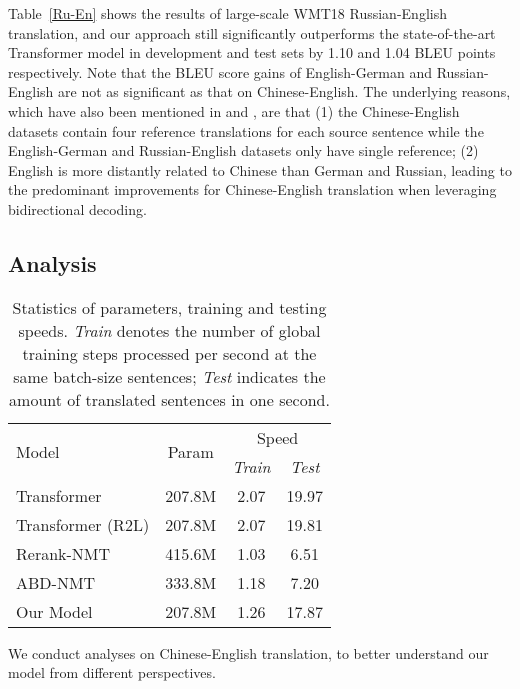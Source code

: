 \documentclass[11pt,a4paper]{article}
\begin{document}
\begin{CJK*}{UTF8}{gbsn}
Table~\ref{Ru-En} shows the results of large-scale WMT18 Russian-English translation, and our approach still significantly outperforms the state-of-the-art Transformer model in development and test sets by 1.10 and 1.04 BLEU points respectively.
Note that the BLEU score gains of English-German and Russian-English are not as significant as that on Chinese-English. The underlying reasons, which have also been mentioned in  and , are that
(1) the Chinese-English datasets contain four reference translations for each source sentence while the English-German and Russian-English datasets only have single reference;
(2) English is more distantly related to Chinese than German and Russian, leading to the predominant improvements for Chinese-English translation when leveraging bidirectional decoding.


\subsection{Analysis}

\begin{table}
	\centering
	\begin{tabular}{l|c|cc}
		\hline
		\multirow{2}{*}{Model} &  \multirow{2}{*}{Param}   &   \multicolumn{2}{c}{Speed} \\
		&                               &    \emph{Train}   & \emph{Test}     \\
		\hline
		\hline
		Transformer       &  207.8M &    2.07       &  19.97 \\
		Transformer (R2L)  &  207.8M &    2.07          &  19.81  \\
		Rerank-NMT         &  415.6M&    1.03       & 6.51\\
		ABD-NMT            &  333.8M &    1.18          & 7.20 \\
		\hline
		\hline
		Our Model          &  207.8M &      1.26   &    17.87 \\
		\hline
	\end{tabular}
	\caption{Statistics of parameters, training and testing speeds. \emph{Train} denotes the number of global training steps processed per second at the same batch-size sentences; \emph{Test} indicates the amount of translated sentences in one second.} \label{params}
\end{table}

We conduct analyses on Chinese-English translation, to better understand our model from different perspectives.


\end{CJK*}
\end{document}
